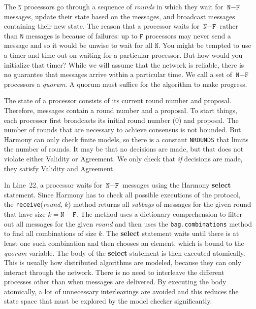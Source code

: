 \documentclass{report}
\begin{document}
The $\mathtt{N}$ processors go through a sequence of \emph{rounds} in which they wait for
$\texttt{N} - \texttt{F}$ messages, update their state based on the messages, and
broadcast messages containing their new state.
The reason that a processor waits for $\texttt{N} - \texttt{F}$ rather than \texttt{N}
messages is because of failures: up to $\texttt{F}$ processors may never send a message
and so it would be unwise to wait for all $\texttt{N}$.  You might be tempted to use
a timer and time out on waiting for a particular processor.  But how would you initialize
that timer?  While we will assume that the network is reliable, there is no guarantee
that messages arrive within a particular time.
We call a set of $\texttt{N} - \texttt{F}$ processors a \emph{quorum}.
A quorum must suffice for the algorithm to make progress.

The state of a processor consists
of its current round number and proposal.  Therefore, messages contain
a round number and a proposal. To start things, each processor first
broadcasts its initial round number (0) and proposal.
The number of rounds that are necessary to achieve consensus is not bounded.  But
Harmony can only check finite models, so there is a constant \texttt{NROUNDS} that
limits the number of rounds.  It may be that no decisions are made, but that does not
violate either Validity or Agreement.  We only check that \emph{if} decisions are
made, they satisfy Validity and Agreement.

In Line~22, a processor waits for $\texttt{N} - \texttt{F}$ messages using
the Harmony \textbf{select} statement.
Since Harmony has to check all possible executions of the protocol, the
\texttt{receive}(\textit{round}, $k$) method returns all \emph{subbags} of messages
for the given round that have size $k = \texttt{N} - \texttt{F}$.  The method uses a
dictionary comprehension to filter out all messages for the given \textit{round}
and then uses the \texttt{bag.combinations} method to find all combinations of size $k$.
The \textbf{select} statement waits until there is at least one such combination and
then chooses an element, which is bound to the \textit{quorum} variable.
The body of the \textbf{select} statement is then executed atomically.
This is usually how distributed algorithms are modeled, because they can only interact
through the network.  There is no need to interleave the different processes other
than when messages are delivered.  By executing the body atomically, a lot of
unnecessary interleavings are avoided and this reduces the state space that must
be explored by the model checker significantly.
\end{document}
